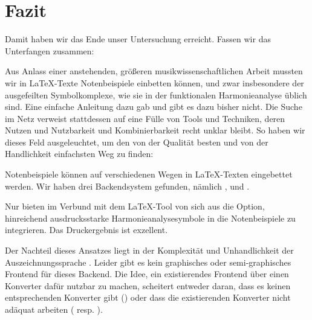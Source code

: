%
%
%




\chapter{Fazit}

Damit haben wir das Ende unser Untersuchung erreicht. Fassen wir das Unterfangen
zusammen:

Aus Anlass einer anstehenden, größeren musikwissenschaftlichen Arbeit mussten
wir in \LaTeX-Texte Notenbeispiele einbetten können, und zwar insbesondere der
ausgefeilten Symbolkomplexe, wie sie in der funktionalen Harmonieanalyse üblich
sind. Eine einfache Anleitung dazu gab und gibt es dazu bisher nicht. Die Suche
im Netz verweist stattdessen auf eine Fülle von Tools und Techniken, deren
Nutzen und Nutzbarkeit und Kombinierbarkeit recht unklar bleibt. So haben wir
dieses Feld ausgeleuchtet, um den von der Qualität besten und von der
Handlichkeit einfachsten Weg zu finden:

Notenbeispiele können auf verschiedenen Wegen in \LaTeX-Texten eingebettet
werden. Wir haben drei Backendsystem gefunden, nämlich
,  und
.

Nur  bieten im Verbund mit dem \LaTeX-Tool
 von sich aus die Option, hinreichend ausdrucksstarke
Harmonieanalysesymbole in die Notenbeispiele zu integrieren. Das Druckergebnis
ist exzellent.

Der Nachteil dieses Ansatzes liegt in der Komplexität und Unhandlichkeit der
Auszeichnungssprache . Leider gibt es kein graphisches oder
semi-graphisches Frontend für dieses Backend. Die Idee, ein existierendes
Frontend über einen Konverter dafür nutzbar zu machen, scheitert entweder daran,
dass es keinen entsprechenden Konverter gibt () oder dass die
existierenden Konverter nicht adäquat arbeiten ( resp. ).


